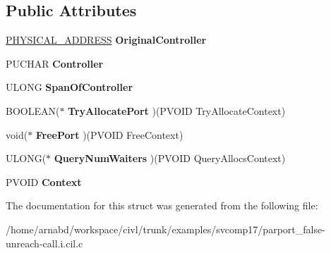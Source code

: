 \subsection*{Public Attributes}
\begin{DoxyCompactItemize}
\item 
\hypertarget{struct__PARALLEL__PORT__INFORMATION_ad14cc1e5eae1beb81ab5bc08046a8927}{}\hyperlink{union__LARGE__INTEGER}{P\+H\+Y\+S\+I\+C\+A\+L\+\_\+\+A\+D\+D\+R\+E\+S\+S} {\bfseries Original\+Controller}\label{struct__PARALLEL__PORT__INFORMATION_ad14cc1e5eae1beb81ab5bc08046a8927}

\item 
\hypertarget{struct__PARALLEL__PORT__INFORMATION_a5a1355ab7256e672e46e64cd4e62c74e}{}P\+U\+C\+H\+A\+R {\bfseries Controller}\label{struct__PARALLEL__PORT__INFORMATION_a5a1355ab7256e672e46e64cd4e62c74e}

\item 
\hypertarget{struct__PARALLEL__PORT__INFORMATION_a6f216b012eaf7240f81d5950bbd25c30}{}U\+L\+O\+N\+G {\bfseries Span\+Of\+Controller}\label{struct__PARALLEL__PORT__INFORMATION_a6f216b012eaf7240f81d5950bbd25c30}

\item 
\hypertarget{struct__PARALLEL__PORT__INFORMATION_a0b1b7bdc84a586a357efefdbd2da39d3}{}B\+O\+O\+L\+E\+A\+N($\ast$ {\bfseries Try\+Allocate\+Port} )(P\+V\+O\+I\+D Try\+Allocate\+Context)\label{struct__PARALLEL__PORT__INFORMATION_a0b1b7bdc84a586a357efefdbd2da39d3}

\item 
\hypertarget{struct__PARALLEL__PORT__INFORMATION_a2aa0eeeb6a348ee35efada599c40c64a}{}void($\ast$ {\bfseries Free\+Port} )(P\+V\+O\+I\+D Free\+Context)\label{struct__PARALLEL__PORT__INFORMATION_a2aa0eeeb6a348ee35efada599c40c64a}

\item 
\hypertarget{struct__PARALLEL__PORT__INFORMATION_a16dde57ec80203ab84ba258da65b3d06}{}U\+L\+O\+N\+G($\ast$ {\bfseries Query\+Num\+Waiters} )(P\+V\+O\+I\+D Query\+Allocs\+Context)\label{struct__PARALLEL__PORT__INFORMATION_a16dde57ec80203ab84ba258da65b3d06}

\item 
\hypertarget{struct__PARALLEL__PORT__INFORMATION_ada522521ba222f913dfa7915bac3f999}{}P\+V\+O\+I\+D {\bfseries Context}\label{struct__PARALLEL__PORT__INFORMATION_ada522521ba222f913dfa7915bac3f999}

\end{DoxyCompactItemize}


The documentation for this struct was generated from the following file\+:\begin{DoxyCompactItemize}
\item 
/home/arnabd/workspace/civl/trunk/examples/svcomp17/parport\+\_\+false-\/unreach-\/call.\+i.\+cil.\+c\end{DoxyCompactItemize}
